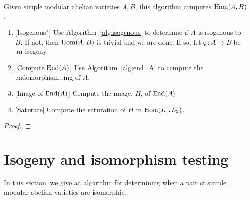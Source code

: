 \begin{algorithm}
    Given simple modular abelian varieties $A, B$, this algorithm computes
    $\operatorname{Hom}(A,B)$.
    \begin{enumerate}
        \item{} [Isogenous?]
            Use Algorithm~\ref{alg:isogenous} to determine if $A$ is isogenous
            to $B$. If not, then $\operatorname{Hom}(A,B)$ is trivial and we are done. If so,
            let $\varphi:A\to B$ be an isogeny.
        \item{} [Compute $\operatorname{End}(A)$]
            Use Algorithm~\ref{alg:end_A} to compute the endomorphism ring of
            $A$.
        \item{} [Image of $\operatorname{End}(A)$]
            Compute the image, $H$, of $\operatorname{End}(A)$
        \item{} [Saturate]
            Compute the saturation of $H$ in $\operatorname{Hom}(L_1, L_2)$.
    \end{enumerate}
\end{algorithm}
\begin{proof}
    
\end{proof}



\section{Isogeny and isomorphism testing}

In this section, we give an algorithm for determining when a pair of simple
modular abelian varieties are isomorphic.

